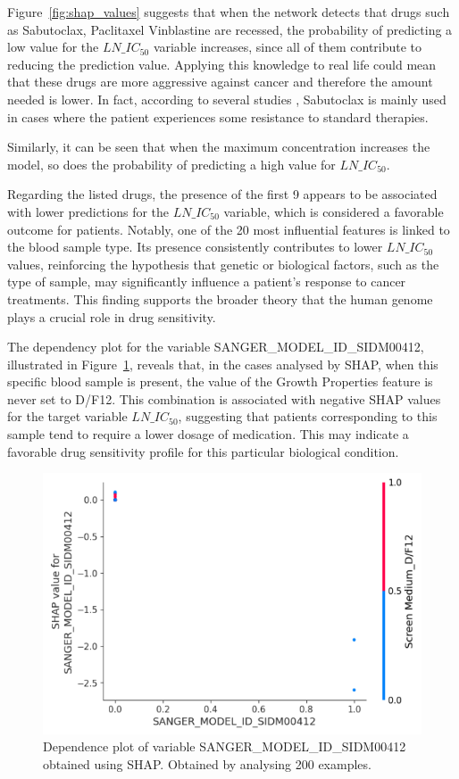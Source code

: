 Figure~\ref{fig:shap_values} suggests that when the network detects that drugs such as Sabutoclax, Paclitaxel Vinblastine are recessed, the probability of predicting a low value for the \(LN\_IC_{50}\) variable increases, since all of them contribute to reducing the prediction value. Applying this knowledge to real life could mean that these drugs are more aggressive against cancer and therefore the amount needed is lower. In fact, according to several studies \cite{Hu2018Sabutoclax, DAguanno2020Bcl2}, Sabutoclax is mainly used in cases where the patient experiences some resistance to standard therapies.

Similarly, it can be seen that when the maximum concentration increases the model, so does the probability of predicting a high value for \(LN\_IC_{50}\).

Regarding the listed drugs, the presence of the first 9 appears to be associated with lower predictions for the \(LN\_IC_{50}\) variable, which is considered a favorable outcome for patients. Notably, one of the 20 most influential features is linked to the blood sample type. Its presence consistently contributes to lower \(LN\_IC_{50}\) values, reinforcing the hypothesis that genetic or biological factors, such as the type of sample, may significantly influence a patient's response to cancer treatments. This finding supports the broader theory that the human genome plays a crucial role in drug sensitivity.

The dependency plot for the variable SANGER\_MODEL\_ID\_SIDM00412, illustrated in Figure~\ref{fig:dependenceSanger}, reveals that, in the cases analysed by SHAP, when this specific blood sample is present, the value of the Growth Properties feature is never set to D/F12. This combination is associated with negative SHAP values for the target variable  \(LN\_IC_{50}\), suggesting that patients corresponding to this sample tend to require a lower dosage of medication. This may indicate a favorable drug sensitivity profile for this particular biological condition.

\begin{figure}[H]
    \centering
    \includegraphics[width=1\textwidth]{figures/shap/dependence_plot_sanger.png}
    \caption{Dependence plot of variable SANGER\_MODEL\_ID\_SIDM00412 obtained using SHAP. Obtained by analysing 200 examples.}
    \label{fig:dependenceSanger}
\end{figure}